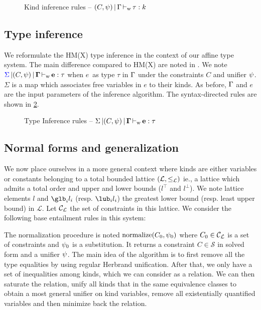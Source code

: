 \begin{figure}[h]
  \centering
  
  \caption{Kind inference rules -- $(C,\mathrm{\psi}) \operatorname{|} \Gamma \operatorname{\vdash_w} \tau : k$}
  \label{rules:kinding}
\end{figure}


\subsection{Type inference}

We reformulate the HM(X) type inference in the context of our affine type
system. The main difference compared to HM(X) are noted in .
We note ${\color{blue}{\Sigma}} \operatorname{|} (C,\mathrm{\psi}) \operatorname{|} \bf{\Gamma} \operatorname{\vdash_w} \bf{e} : \tau$ when
$e$\ as type $\tau$ in $\Gamma$ under the constraints $C$ and unifier $\mathrm{\psi}$.
$\Sigma$ is a map which associates free variables in $e$ to
their kinds.
As before, $\Gamma$ and $e$ are the input parameters of the inference
algorithm. The syntax-directed rules are shown in \cref{rules:typing}.

\begin{figure*}[h]
  
  \caption{Type Inference rules -- $\Sigma \operatorname{|} (C,\psi) \operatorname{|} \bf{\Gamma} \operatorname{\vdash_w} \bf{e} : \tau$ }
  \label{rules:typing}
\end{figure*}

\subsection{Normal forms and generalization}
\label{sec:normalize}


We now place ourselves in a more general context where kinds are either variables
or constants belonging to a total bounded lattice $(\mathcal L, \leq_\mathcal L)$ ie.,
a lattice which admits a total order and upper and lower bounds ($l^\top$ and $l^\bot$).
We note lattice elements $l$ and $\glb_i l_i$ (resp. $\lub_i l_i$)
the greatest lower bound (resp. least upper bound) in $\mathcal L$.
%
Let ${\mathcal C_{\mathcal L}}$ the set of constraints in this lattice. We consider the
following base entailment rules in this system:
\begin{center}
\end{center}



The normalization procedure is noted $\operatorname{normalize}(C_0,\mathrm{\psi}_0)$ where
$C_0\in {\mathcal C_{\mathcal L}}$ is a set of constraints and $\mathrm{\psi}_0$ is a substitution.
It returns a constraint $C \in \mathcal S$ in
solved form and a unifier $\mathrm{\psi}$.
The main idea of the algorithm is to first remove all the type equalities
by using regular Herbrand unification. After that, we only have
a set of inequalities among kinds, which we can consider as a relation.
We can then saturate the relation,
unify all kinds that in the same equivalence classes to obtain
a most general unifier on kind variables,
remove all existentially quantified variables and
then minimize back the relation.

